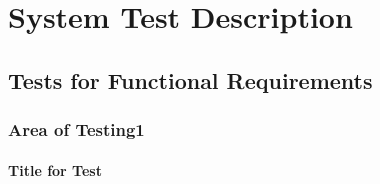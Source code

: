 \documentclass[12pt, titlepage]{article}
\begin{document}
\section{System Test Description}
	
\subsection{Tests for Functional Requirements} \label{section:31}

\subsubsection{Area of Testing1}
		
\paragraph{Title for Test}
\end{document}
